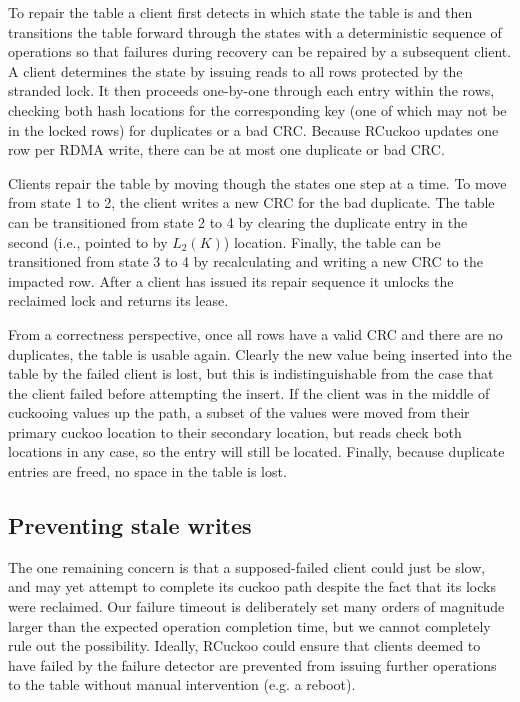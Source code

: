 To repair the table a client first detects in which state the table is
and then transitions the table forward through the states with a
deterministic sequence of operations so that failures during recovery
can be repaired by a subsequent client. A client determines the state
by issuing reads to all rows protected by the stranded lock.  It then
proceeds one-by-one through each entry within the rows, checking both
hash locations for the corresponding key (one of which may not be in
the locked rows) for duplicates or a bad CRC.  Because RCuckoo updates
one row per RDMA write, there can be at most one duplicate or bad CRC.

Clients repair the table by moving though the states one step at a time.
To move from state 1 to 2, the client writes a new CRC for
the bad duplicate.  The table can be transitioned from state 2 to 4 by
clearing the duplicate entry in the second (i.e., pointed to by
$L_2(K)$) location. Finally, the table can be transitioned from state
3 to 4 by recalculating and writing a new CRC to the impacted
row. After a client has issued its repair sequence it unlocks the
reclaimed lock and returns its lease.

From a correctness perspective, once all rows have a valid CRC and
there are no duplicates, the table is usable again.  Clearly the new
value being inserted into the table by the failed client is lost, but
this is indistinguishable from the case that the client failed before
attempting the insert.  If the client was in the middle of cuckooing
values up the path, a subset of the values were moved from their
primary cuckoo location to their secondary location, but reads check
both locations in any case, so the entry will still be located.
Finally, because duplicate entries are freed, no space in the table is
lost.

\subsection{Preventing stale writes}
\label{sec:stale-writes}

The one remaining concern is that a supposed-failed client could
just be slow, and may yet attempt to complete its cuckoo path despite
the fact that its locks were reclaimed.
Our failure timeout is
deliberately set many orders of magnitude larger than the expected
operation completion time, but we cannot completely rule out the
possibility.  Ideally, RCuckoo could ensure that clients deemed to have
failed by the failure detector are prevented from issuing further
operations to the table without manual intervention (e.g. a reboot).


